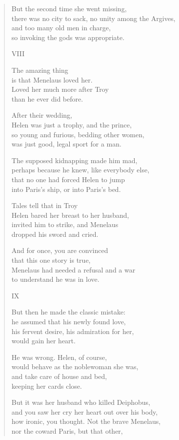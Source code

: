 \documentclass[11pt,a4paper]{article}
\begin{document}
\begin{verse}
But the second time she went missing,\\
there was no city to sack, no unity among the Argives,\\
and too many old men in charge,\\
so invoking the gods was appropriate.

VIII

The amazing thing\\
is that Menelaus loved her.\\
Loved her much more after Troy\\
than he ever did before.

After their wedding,\\
Helen was just a trophy, and the prince,\\
so young and furious, bedding other women,\\
was just good, legal sport for a man.

The supposed kidnapping made him mad,\\
perhaps because he knew, like everybody else,\\
that no one had forced Helen to jump\\
into Paris's ship, or into Paris's bed.

Tales tell that in Troy\\
Helen bared her breast to her husband,\\
invited him to strike, and Menelaus\\
dropped his sword and cried.

And for once, you are convinced\\
that this one story is true,\\
Menelaus had needed a refusal and a war\\
to understand he was in love.

IX

But then he made the classic mistake:\\
he assumed that his newly found love,\\
his fervent desire, his admiration for her,\\
would gain her heart.

He was wrong. Helen, of course,\\
would behave as the noblewoman she was,\\
and take care of house and bed,\\
keeping her cards close.

But it was her husband who killed Deiphobus,\\
and you saw her cry her heart out over his body,\\
how ironic, you thought. Not the brave Menelaus,\\
nor the coward Paris, but that other,


\end{verse}
\end{document}
